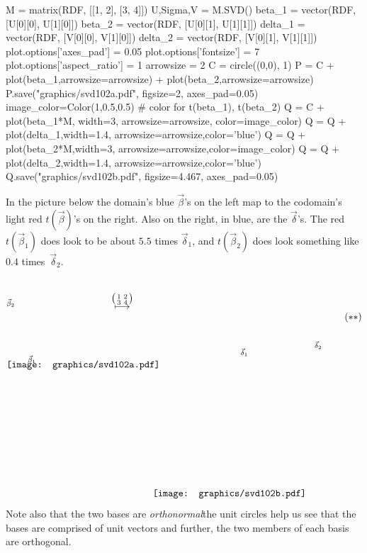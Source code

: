 \begin{sagesilent}
M = matrix(RDF, [[1, 2], [3, 4]])
U,Sigma,V = M.SVD()
beta_1 = vector(RDF, [U[0][0], U[1][0]])
beta_2 = vector(RDF, [U[0][1], U[1][1]])
delta_1 = vector(RDF, [V[0][0], V[1][0]])
delta_2 = vector(RDF, [V[0][1], V[1][1]])
plot.options['axes_pad'] = 0.05
plot.options['fontsize'] = 7
plot.options['aspect_ratio'] = 1
arrowsize = 2
C = circle((0,0), 1)
P = C + plot(beta_1,arrowsize=arrowsize) + plot(beta_2,arrowsize=arrowsize)
P.save("graphics/svd102a.pdf", figsize=2, axes_pad=0.05)
image_color=Color(1,0.5,0.5)   # color for t(beta_1), t(beta_2)
Q = C + plot(beta_1*M, width=3, arrowsize=arrowsize, color=image_color) 
Q = Q + plot(delta_1,width=1.4, arrowsize=arrowsize,color='blue') 
Q = Q + plot(beta_2*M,width=3, arrowsize=arrowsize,color=image_color) 
Q = Q + plot(delta_2,width=1.4, arrowsize=arrowsize,color='blue')
Q.save("graphics/svd102b.pdf", figsize=4.467, axes_pad=0.05)
\end{sagesilent}
In the picture below the domain's 
blue $\vec{\beta}$'s on the left map to the codomain's light red 
$t(\vec{\beta})$'s on the right.
Also on the right, in blue, are the $\vec{\delta}$'s.
The red $t(\vec{\beta}_1)$ does look to be about $5.5$ times $\vec{\delta}_1$,
and $t(\vec{\beta}_2)$ does look something like $0.4$ times~$\vec{\delta}_2$. 
\begin{equation*}
  \setlength{\unitlength}{1in}
  \begin{picture}(1.35,1.35)
    \put(0,1.825){\texttt{[image: graphics/svd102a.pdf]}}
    \put(.3,1.9){\scriptsize $\vec{\beta}_1$}
    \put(0,2.7){\scriptsize $\vec{\beta}_2$}
  \end{picture}
  \quad
  \raisebox{2.65in}{$\mapsunder{\big (\begin{smallmatrix} 1 &2 \\ 3 &4 \end{smallmatrix}\big )}$}
  \qquad
  \begin{picture}(2.45,3.15)
    \put(0,0){\texttt{[image: graphics/svd102b.pdf]}}
    \put(1.25,2){\scriptsize $\vec{\delta}_1$}
    \put(2.3,2.1){\scriptsize $\vec{\delta}_2$}
  \end{picture}
  \tag*{\raisebox{2.5in}{($**$)}}
\end{equation*}
Note also that the two bases are \textit{orthonormal}\Dash the unit circles help
us see that the bases are comprised of unit vectors and further,
the two members of each basis are orthogonal.

